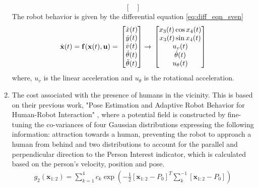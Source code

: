 \begin{enumerate}
{\begin{equation}
{\begin{bmatrix}
		\end{bmatrix}}		
	\end{equation}
	The robot behavior is given by the differential equation \autoref{eq:diff_eqn_sven}
	\begin{equation}
	\label{eq:diff_eqn_sven}
	\dot{\textbf{x}}(t) = 
	\mathbf{f}(\textbf{x}(t), \mathbf{u})
	=
	{%
		\vphantom{\begin{bmatrix}0\\0\\0\\0\\0\end{bmatrix}}
		\begin{bmatrix}
		\dot{x}(t)\\\dot{y}(t)\\\dot{v}(t)\\\dot{\theta}(t)\\\ddot{\theta}(t)
		\end{bmatrix}}	
	\rightarrow
	{%
		\vphantom{\begin{bmatrix}0\\0\\0\\0\\0\end{bmatrix}}
		\begin{bmatrix}
		x_3(t)\cos{x_4(t)}\\	x_3(t)\sin{x_4(t)}\\u_v(t)\\ \dot{\theta}(t) \\ u_\theta(t)
		\end{bmatrix}}		
	\end{equation}
	where, $u_v$ is the linear acceleration and $u_\theta$ is the rotational acceleration.}
	\item The cost associated with the presence of humans in the vicinity. This is based on their previous work, "Pose Estimation and Adaptive Robot Behavior for Human-Robot Interaction" \cite{svenstrup_pose_estimation_2009}, where a potential field is constructed by fine-tuning the co-variances of four Gaussian distributions expressing the following information: attraction towards a human, preventing the robot to approach a human from behind and two distributions to account for the parallel and perpendicular direction to the Person Interest indicator, which is calculated based on the person's velocity, position and pose.  
	\begin{align}
	g_{2}(\textbf{x}_{1:2}) = \sum_{k=1}^{4}c_{k}\exp(-\frac{1}{2}[\textbf{x}_{1:2} - P_0]^{T}\sum^{-1}_{k}[\textbf{x}_{1:2} - P_0])

\end{align}
\end{enumerate}
